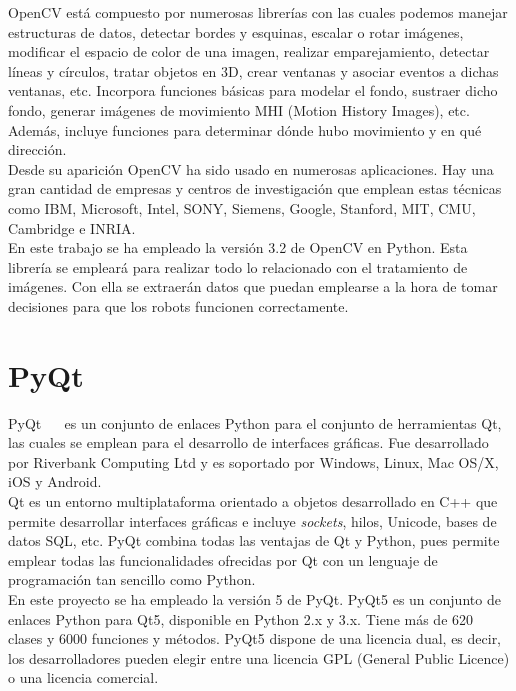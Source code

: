 OpenCV está compuesto por numerosas librerías con las cuales podemos manejar estructuras de datos, detectar bordes y esquinas, escalar o rotar imágenes, modificar el espacio de color de una imagen, realizar emparejamiento, detectar líneas y círculos, tratar objetos en 3D, crear ventanas y asociar eventos a dichas ventanas, etc. Incorpora funciones básicas para modelar el fondo, sustraer dicho fondo, generar imágenes de movimiento MHI (Motion History Images), etc. Además, incluye funciones para determinar dónde hubo movimiento y en qué dirección. \\


Desde su aparición OpenCV ha sido usado en numerosas aplicaciones. Hay una gran cantidad de empresas y centros de investigación que emplean estas técnicas como IBM, Microsoft, Intel, SONY, Siemens, Google, Stanford, MIT, CMU, Cambridge e INRIA.\\

En este trabajo se ha empleado la versión 3.2 de OpenCV en Python. Esta librería se empleará para realizar todo lo relacionado con el tratamiento de imágenes. Con ella se extraerán datos que puedan emplearse a la hora de tomar decisiones para que los robots funcionen correctamente.

\section{PyQt}
PyQt~\cite{python1} ~\cite{pqt} es un conjunto de enlaces Python para el conjunto de herramientas Qt, las cuales se emplean para el desarrollo de interfaces gráficas. Fue desarrollado por Riverbank Computing Ltd y es soportado por Windows, Linux, Mac OS/X, iOS y Android.\\

Qt es un entorno multiplataforma orientado a objetos desarrollado en C++  que permite desarrollar interfaces gráficas e incluye \textit{sockets}, hilos, Unicode, bases de datos SQL, etc. PyQt combina todas las ventajas de Qt y Python, pues permite emplear todas las funcionalidades ofrecidas por Qt con un lenguaje de programación tan sencillo como Python.\\

En este proyecto se ha empleado la versión 5 de PyQt. PyQt5 es un conjunto de enlaces Python para Qt5, disponible en Python 2.x y 3.x. Tiene más de 620 clases y 6000 funciones y métodos. PyQt5 dispone de una licencia dual, es decir, los desarrolladores pueden elegir entre una licencia GPL (General Public Licence) o una licencia comercial. \\

